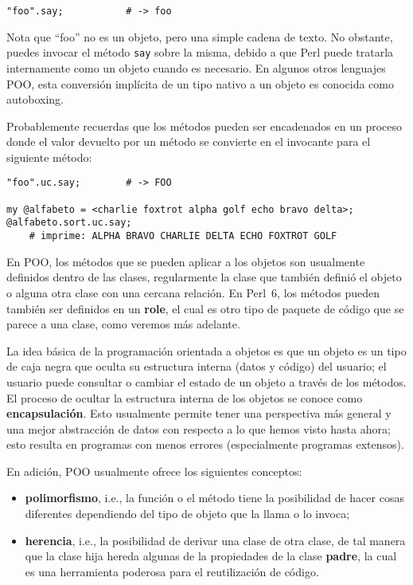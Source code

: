 \begin{verbatim}
"foo".say;           # -> foo
\end{verbatim}

Nota que ``foo'' no es un objeto, pero una simple cadena de texto.
No obstante, puedes invocar el método \verb|say| sobre la misma,
debido a que Perl puede tratarla internamente como un objeto cuando
es necesario. En algunos otros lenguajes POO, esta conversión implícita
de un tipo nativo a un objeto es conocida como autoboxing.

Probablemente recuerdas que los métodos pueden ser encadenados
en un proceso donde el valor devuelto por un método se convierte
en el invocante para el siguiente método:

\begin{verbatim}
"foo".uc.say;        # -> FOO

my @alfabeto = <charlie foxtrot alpha golf echo bravo delta>;
@alfabeto.sort.uc.say;
    # imprime: ALPHA BRAVO CHARLIE DELTA ECHO FOXTROT GOLF 
\end{verbatim}

En POO, los métodos que se pueden aplicar a los objetos son
usualmente definidos dentro de las clases, regularmente
la clase que también definió el objeto o alguna otra clase 
con una cercana relación. En Perl~6, los métodos pueden también
ser definidos en un {\bf role}, el cual es otro tipo de 
paquete de código que se parece a una clase, como veremos
más adelante.

La idea básica de la programación orientada a objetos es
que un objeto es un tipo de caja negra que oculta su
estructura interna (datos y código) del usuario; el usuario
puede consultar o cambiar el estado de un objeto a través de
los métodos. El proceso de ocultar la estructura interna
de los objetos se conoce como {\bf encapsulación}. Esto usualmente
permite tener una perspectiva más general y una mejor abstracción
de datos con respecto a lo que hemos visto hasta ahora;
esto resulta en programas con menos errores (especialmente programas
extensos).

En adición, POO usualmente ofrece los siguientes conceptos:
\begin{itemize}
\item {\bf polimorfismo}, i.e., la función o el método tiene la
posibilidad de hacer cosas diferentes dependiendo del tipo de 
objeto que la llama o lo invoca;
\item {\bf herencia}, i.e., la posibilidad de derivar una clase de
otra clase, de tal manera que la clase hija hereda algunas de la 
propiedades de la clase {\bf padre}, la cual es una herramienta
poderosa para el reutilización de código.
\end{itemize}

